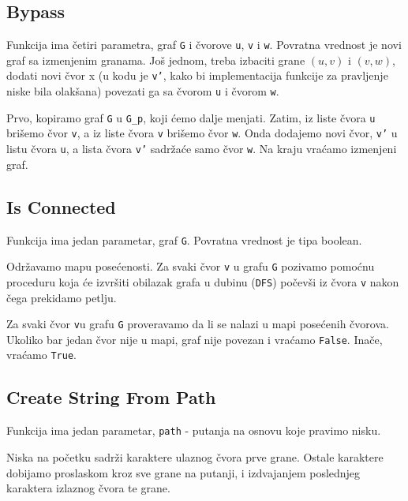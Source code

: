 \subsection{Bypass}

Funkcija ima četiri parametra, graf \texttt{G} i čvorove \texttt{u}, \texttt{v} i \texttt{w}. Povratna vrednost je novi graf sa izmenjenim granama. Još jednom, treba izbaciti grane $(u, v)$ i $(v, w)$, dodati novi čvor x (u kodu je \texttt{v'}, kako bi implementacija funkcije za pravljenje niske bila olakšana) povezati ga sa čvorom \texttt{u} i čvorom \texttt{w}.

Prvo, kopiramo graf \texttt{G} u \texttt{G\_p}, koji ćemo dalje menjati. Zatim, iz liste čvora \texttt{u} brišemo čvor \texttt{v}, a iz liste čvora \texttt{v} brišemo čvor \texttt{w}. Onda dodajemo novi čvor, \texttt{v'} u listu čvora \texttt{u}, a lista čvora \texttt{v'}  sadržaće samo čvor \texttt{w}. Na kraju vraćamo izmenjeni graf.





\subsection{Is Connected}

Funkcija ima jedan parametar, graf \texttt{G}. Povratna vrednost je tipa boolean.

Održavamo mapu posećenosti. Za svaki čvor \texttt{v} u grafu \texttt{G} pozivamo pomoćnu proceduru koja će izvršiti obilazak grafa u dubinu (\texttt{DFS}) počevši iz čvora \texttt{v} nakon čega prekidamo petlju.

Za svaki čvor \texttt{v}u grafu \texttt{G} proveravamo da li se nalazi u mapi posećenih čvorova. Ukoliko bar jedan čvor nije u mapi, graf nije povezan i vraćamo \texttt{False}. Inače, vraćamo \texttt{True}.




\subsection{Create String From Path}

Funkcija ima jedan parametar, \texttt{path} - putanja na osnovu koje pravimo nisku.

Niska na početku sadrži karaktere ulaznog čvora prve grane. Ostale karaktere dobijamo proslaskom kroz sve grane na putanji, i izdvajanjem poslednjeg karaktera izlaznog čvora te grane.


